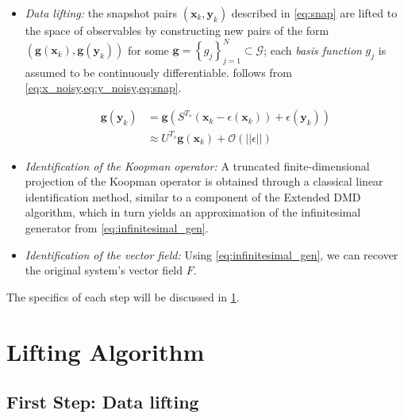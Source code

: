 \documentclass{article}
\begin{document}
        \begin{itemize}
            \item \textit{Data lifting:} the snapshot pairs $\left(\mathbf{x}_k,\mathbf{y}_k\right)$ described in \cref{eq:snap} are lifted to the space of observables by constructing new pairs of the form\\$\left(\mathbf{g}\left(\mathbf{x}_k\right),\mathbf{g}\left(\mathbf{y}_k\right)\right)$ for some $\mathbf{g} = \left\{g_j\right\}_{j=1}^{N} \subset \mathcal{G}$; each \textit{basis function} $g_j$ is assumed to be continuously differentiable.  follows from \cref{eq:x_noisy,eq:y_noisy,eq:snap}.
            
            \begin{align} \label{eq:Koopman_snap}
                \mathbf{g} \left(\mathbf{y}_k\right) &= \mathbf{g} \left(S^{T_s} \left(\mathbf{x}_k - \epsilon\left(\mathbf{x}_k\right)\right) + \epsilon\left(\mathbf{y}_k\right)\right)
                \\
                & \approx U^{T_s} \mathbf{g}\left(\mathbf{x}_k\right) + \mathcal{O} \left(\left|\left|\epsilon\right|\right|\right)
            \end{align}

            \item \textit{Identification of the Koopman operator:} A truncated finite-dimensional projection of the Koopman operator is obtained through a classical linear identification method, similar to a component of the Extended DMD algorithm\cite{EDMD}, which in turn yields an approximation of the infinitesimal generator from \ref{eq:infinitesimal_gen}.
            
            \item \textit{Identification of the vector field:} Using \ref{eq:infinitesimal_gen}, we can recover the original system's vector field $F$.
        \end{itemize}

        The specifics of each step will be discussed in \cref{sec:algorithm}.

\section{Lifting Algorithm} \label{sec:algorithm}

    \subsection{First Step: Data lifting}
\end{document}
